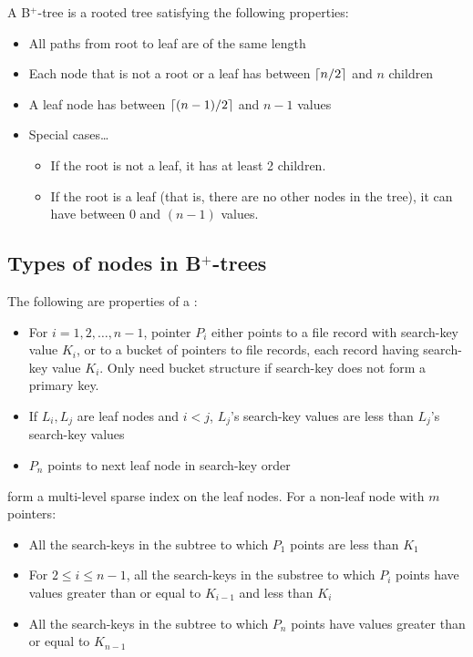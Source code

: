 \documentclass{article}
\begin{document}
A B$^{+}$-tree is a rooted tree satisfying the following properties: 
\begin{itemize}
  \item All paths from root to leaf are of the same length 
  \item Each node that is not a root or a leaf has between $\left\lceil n/2 \right\rceil$ and $n$ children 
  \item A leaf node has between $\left\lceil (n-1)/2 \right\rceil$ and $n-1$ values 
  \item Special cases\dots 
    \begin{itemize}
      \item If the root is not a leaf, it has at least 2 children. 
      \item If the root is a leaf (that is, there are no other nodes in the tree), it can have between $0$ and $(n-1)$ values. 
    \end{itemize}
\end{itemize}

\subsection{Types of nodes in B$^{+}$-trees}

The following are properties of a : 
\begin{itemize}
  \item For $i=1,2, \dots , n-1$, pointer $P_i$ either points to a file record with search-key value $K_i$, or to a bucket of pointers to file records, each record having search-key value $K_i$. Only need bucket structure if search-key does not form a primary key. 
  \item If $L_i , L_j$ are leaf nodes and $i < j$, $L_j$'s search-key values are less than $L_j$'s search-key values 
  \item $P_n$ points to next leaf node in search-key order 
\end{itemize}

 form a multi-level sparse index on the leaf nodes. For a non-leaf node with $m$ pointers: 
\begin{itemize}
  \item All the search-keys in the subtree to which $P_1$ points are less than $K_{1}$ 
  \item For $2 \leq i \leq n - 1$, all the search-keys in the substree to which $P_i$ points have values greater than or equal to $K_{i-1}$ and less than $K_i$ 
  \item All the search-keys in the subtree to which $P_n$ points have values greater than or equal to $K_{n-1}$
\end{itemize}
\end{document}
